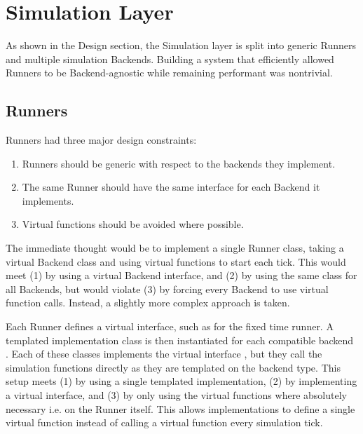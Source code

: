 \section{Simulation Layer}
As shown in the Design section, the Simulation layer is split into generic Runners and multiple simulation Backends.
Building a system that efficiently allowed Runners to be Backend-agnostic while remaining performant was nontrivial.

\subsection{Runners}
Runners had three major design constraints:
\begin{enumerate}
    \item Runners should be generic with respect to the backends they implement.
    \item The same Runner should have the same interface for each Backend it implements.
    \item Virtual functions should be avoided where possible.
\end{enumerate}
The immediate thought would be to implement a single Runner class, taking a virtual Backend class and using virtual functions to start each tick.
This would meet (1) by using a virtual Backend interface, and (2) by using the same class for all Backends, but would violate (3) by forcing every Backend to use virtual function calls.
Instead, a slightly more complex approach is taken.

Each Runner defines a virtual interface, such as  for the fixed time runner.
A templated implementation class  is then instantiated for each compatible backend .
Each of these classes implements the virtual interface , but they call the simulation functions directly as they are templated on the backend type.
This setup meets (1) by using a single templated implementation, (2) by implementing a virtual interface, and (3) by only using the virtual functions where absolutely necessary i.e. on the Runner itself.
This allows  implementations to define a single virtual function  instead of calling a virtual function every simulation tick.

